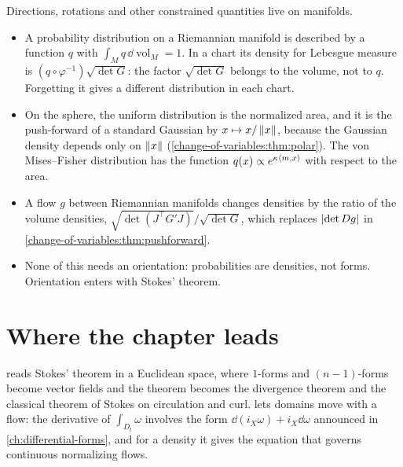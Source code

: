 \begin{notechapter}
\begin{mlthread}
Directions, rotations and other constrained quantities live on
manifolds.
\begin{itemize}[nosep]
  \item A probability distribution on a Riemannian manifold is
        described by a function $q$ with
        $\int_Mq\,\dd\!\operatorname{vol}_M = 1$. In a chart its
        density for Lebesgue measure is
        $(q\circ\varphi^{-1})\sqrt{\det G}$: the factor
        $\sqrt{\det G}$ belongs to the volume, not to $q$. Forgetting
        it gives a different distribution in each chart.
  \item On the sphere, the uniform distribution is the normalized
        area, and it is the push-forward of a standard Gaussian by
        $x\mapsto x/\left\|x\right\|$, because the Gaussian density depends
        only on $\left\|x\right\|$ (\cref{change-of-variables:thm:polar}). The
        von
        Mises--Fisher distribution has the function
        $q(x)\propto e^{\kappa\left\langle m, x \right\rangle}$ with respect to the area.
  \item A flow $g$ between Riemannian manifolds changes densities by
        the ratio of the volume densities,
        $\sqrt{\det(J^\top G'J)}/\sqrt{\det G}$, which replaces
        $\left|\det Dg\right|$ in \cref{change-of-variables:thm:pushforward}.
  \item None of this needs an orientation: probabilities are
        densities, not forms. Orientation enters with Stokes' theorem.
\end{itemize}
\end{mlthread}

\section{Where the chapter leads}\label{stokes:sec:outlook}

 reads Stokes' theorem in a Euclidean space,
where $1$-forms and $(n - 1)$-forms become vector fields and the
theorem becomes the divergence theorem and the classical theorem of
Stokes on circulation and curl.  lets domains move
with a flow: the derivative of $\int_{D_t}\omega$ involves the form
$\dd(i_X\omega) + i_X\dd\omega$ announced in
\cref{ch:differential-forms}, and for a density it gives the equation
that governs continuous normalizing flows.


\end{notechapter}
